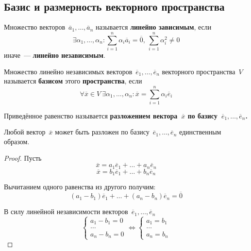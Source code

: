 \subsection{Базис и размерность векторного пространства}
Множество векторов~$\overline a_1, \ldots, \overline a_n$ называется \textbf{линейно зависимым}, если
\begin{equation*}
\exists \alpha_1, \ldots, \alpha_n \colon
\sum_{i=1}^n \alpha_i \overline a_i = \overline 0, \
\sum_{i=1}^n \alpha_i^2 \neq 0
\end{equation*}
иначе~--- \textbf{линейно независимым}.

 Множество линейно независимых векторов~$\overline e_1, \ldots, \overline e_n$ векторного пространства~$V$ называется \textbf{базисом} этого \textbf{пространства}, если
\begin{equation*}
\forall \overline x \in V \
\exists \alpha_1, \ldots, \alpha_n \colon
\overline x = \sum_{i=1}^n \alpha_i \overline e_i
\end{equation*}

Приведённое равенство называется \textbf{разложением вектора~$\overline x$ по базису~$\overline e_1, \ldots, \overline e_n$.}

\begin{theorem}[о~базисе]
Любой вектор~$\overline x$ может быть разложен по базису~$\overline e_1, \ldots, \overline e_n$ единственным образом.
\end{theorem}
\begin{proof}
Пусть
\begin{equation*}
\overline x = a_1 \overline e_1 + \ldots + a_n \overline e_n
\end{equation*}
\begin{equation*}
\overline x = b_1 \overline e_1 + \ldots + b_n \overline e_n
\end{equation*}

Вычитанием одного равенства из другого получим:
\begin{equation*}
(a_1 - b_1) \overline e_1 + \ldots + (a_n - b_n) \overline e_n = \overline 0
\end{equation*}

В силу линейной независимости векторов~$\overline e_1, \ldots, \overline e_n$
\begin{equation*}
\begin{cases}
a_1 - b_1 = 0 \\
\ldots \\
a_n - b_n = 0
\end{cases}
\Leftrightarrow
\begin{cases}
a_1 = b_1 \\
\ldots \\
a_n = b_n
\end{cases}
\end{equation*}
\end{proof}

